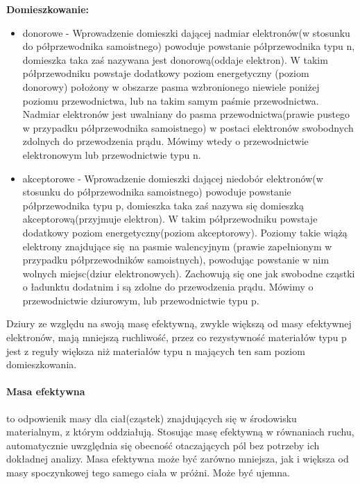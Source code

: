 \documentclass{article}
\begin{document}
            \textbf{Domieszkowanie: }
            \begin{itemize}
                \item donorowe - Wprowadzenie domieszki dającej nadmiar
                elektronów(w stosunku do półprzewodnika samoistnego)
                powoduje powstanie półprzewodnika typu n, domieszka taka
                zaś nazywana jest donorową(oddaje elektron).
                W takim półprzewodniku powstaje dodatkowy poziom energetyczny
                (poziom donorowy) położony w obszarze pasma wzbronionego niewiele
                poniżej poziomu przewodnictwa, lub na takim samym paśmie przewodnictwa.
                Nadmiar elektronów jest uwalniany do pasma przewodnictwa(prawie pustego
                w przypadku półprzewodnika samoistnego) w postaci elektronów swobodnych
                zdolnych do przewodzenia prądu. Mówimy wtedy o przewodnictwie
                elektronowym lub przewodnictwie typu n.

                \item akceptorowe - Wprowadzenie domieszki dającej niedobór
                elektronów(w stosunku do półprzewodnika samoistnego) powoduje
                powstanie półprzewodnika typu p, domieszka taka zaś nazywa się
                domieszką akceptorową(przyjmuje elektron). W takim półprzewodniku
                powstaje dodatkowy poziom energetyczny(poziom akceptorowy).
                Poziomy takie wiążą elektrony znajdujące się na pasmie walencyjnym
                (prawie zapełnionym w przypadku półprzewodników samoistnych),
                powodując powstanie w nim wolnych miejsc(dziur elektronowych).
                Zachowują się one jak swobodne cząstki o ładunktu dodatnim i są
                zdolne do przewodzenia prądu. Mówimy o przewodnictwie dziurowym,
                lub przewodnictwie typu p.
            \end{itemize}

            Dziury ze względu na swoją masę efektywną, zwykle większą
            od masy efektywnej elektronów, mają mniejszą ruchliwość,
            przez co rezystywność materiałów typu p jest z reguły większa
            niż materiałów typu n mających ten sam poziom domieszkowania.

            \paragraph{Masa efektywna}
            to odpowienik masy dla ciał(cząstek) znajdujących się w środowisku
            materialnym, z którym oddziałują. Stosując masę efektywną w równaniach
            ruchu, automatycznie uwzględnia się obecność otaczających pól
            bez potrzeby ich dokładnej analizy. Masa efektywna może być zarówno
            mniejsza, jak i większa od masy spoczynkowej tego samego ciała
            w próżni. Może być ujemna.
\end{document}
